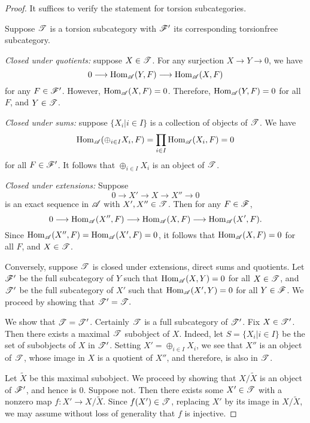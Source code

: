\begin{proof}
It suffices to verify the statement for torsion subcategories.

Suppose $\mathscr{T}$ is a torsion subcategory with $\mathscr{F}'$ its 
corresponding torsionfree subcategory. 

\emph{Closed under quotients:} suppose $X \in \mathscr{T}$. For any 
surjection $X \to Y \to 0$, we have 
\[
0 \longrightarrow \mathrm{Hom}_{\mathscr{A}}(Y, F) \longrightarrow \mathrm{Hom}_{\mathscr{A}}(X, F)
\]
for any $F \in \mathscr{F}'$. However, $\mathrm{Hom}_{\mathscr{A}}(X, F) = 0$.
Therefore, $\mathrm{Hom}_{\mathscr{A}}(Y, F) = 0$ for all $F$, and $Y \in
\mathscr{T}$.

\emph{Closed under sums:} suppose $\{X_i| i \in I\}$ is a 
collection of objects of $\mathscr{T}$. We have
\[
\mathrm{Hom}_{\mathscr{A}}( \oplus_{i \in I} X_i, F) = \prod_{i \in I}
\mathrm{Hom}_{\mathscr{A}}( X_i, F) = 0
\]
for all $F \in \mathscr{F}'$. It follows that $\oplus_{i \in I} X_i$
is an object of $\mathscr{T}$.

\emph{Closed under extensions:} Suppose 
\[
0 \to X' \to X \to X'' \to 0
\]
is an exact sequence in $\mathscr{A}$ with $X', X'' \in \mathscr{T}$.
Then for any $F \in \mathscr{F}$, 
\[
0 \longrightarrow \mathrm{Hom}_{\mathscr{A}}(X'', F) \longrightarrow \mathrm{Hom}_{\mathscr{A}}(X, F) \longrightarrow
\mathrm{Hom}_{\mathscr{A}}(X', F).
\]
Since $\mathrm{Hom}_{\mathscr{A}}(X'', F) = \mathrm{Hom}_{\mathscr{A}}(X', F) = 0$,
it follows that $\mathrm{Hom}_{\mathscr{A}}(X, F) = 0$ for all $F$, and
$X \in \mathscr{T}$.

Conversely, suppose $\mathscr{T}$ is closed under extensions, direct 
sums and quotients. Let $\mathscr{F}'$ be the full subcategory of $Y$ 
such that $\mathrm{Hom}_{\mathscr{A}}(X, Y) = 0$ for all $X \in \mathscr{T}$, and 
$\mathscr{T}'$ be the full subcategory of $X'$ such that 
$\mathrm{Hom}_{\mathscr{A}}(X', Y) = 0$ for all $Y \in \mathscr{F}$. We proceed
by showing that $\mathscr{T'} = \mathscr{T}.$

We show that $\mathscr{T} = \mathscr{T'}$. Certainly $\mathscr{T}$ is a full
subcategory of $\mathscr{T'}$. Fix $X \in \mathscr{T'}$. Then there exists
a maximal $\mathscr{T}$ subobject of $X$. Indeed, let $S = \{X_i| i 
\in I\}$ be the set of subobjects of $X$ in $\mathscr{T'}$. Setting 
$X' = \displaystyle \oplus_{i \in I} X_i$, we see that $X''$ is 
an object of $\mathscr{T}$, whose image in $X$ is a quotient of 
$X''$, and therefore, is also in $\mathscr{T}$. 

Let $\tilde{X}$ be this maximal subobject. We proceed by showing 
that $X/\tilde{X}$ is an object of $\mathscr{F}'$, and hence is 0.
Suppose not. Then there exists some $X' \in \mathscr{T}$ with a 
nonzero map $f: X' \to X/\tilde{X}$. Since $f(X') \in \mathscr{T}$,
replacing $X'$ by its image in $X/\tilde{X}$, we may assume
without loss of generality that $f$ is injective.


\end{proof}
